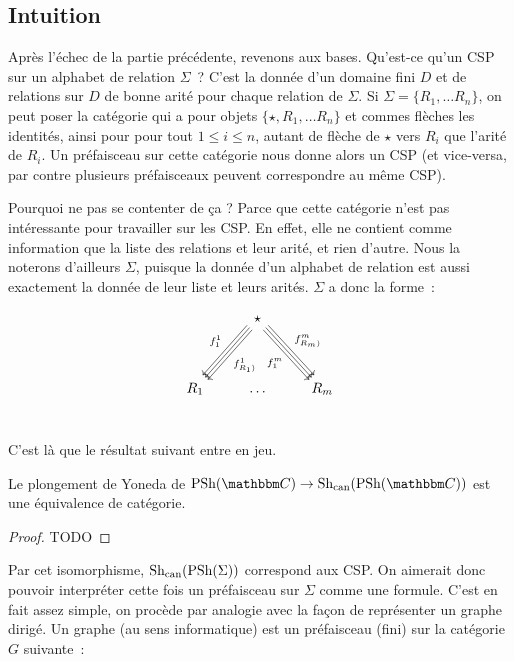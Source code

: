 
\subsection{Intuition}

Après l'échec de la partie précédente, revenons aux bases. Qu'est-ce qu'un CSP
sur un alphabet de relation $\Sigma$~? C'est la donnée d'un domaine fini $D$ et
de relations sur $D$ de bonne arité pour chaque relation de $\Sigma$. Si
$\Sigma = \{R_1, \dots R_n\}$, on peut poser la catégorie qui a pour objets
$\{\star, R_1, \dots R_n\}$ et commes flèches les identités, ainsi pour pour
tout $1\leq i\leq n$, autant de flèche de $\star$ vers $R_i$ que l'arité de
$R_i$. Un préfaisceau sur cette catégorie nous donne alors un CSP (et
vice-versa, par contre plusieurs préfaisceaux peuvent correspondre au même
CSP).

Pourquoi ne pas se contenter de ça ? Parce que cette catégorie n'est pas
intéressante pour travailler sur les CSP. En effet, elle ne contient comme
information que la liste des relations et leur arité, et rien d'autre. Nous la
noterons d'ailleurs $\Sigma$, puisque la donnée d'un alphabet de relation est
aussi exactement la donnée de leur liste et leurs arités. $\Sigma$ a donc la forme~:

\[\begin{tikzcd}
    & \star \arrow[ddl, shift right, swap, "f_1^1"]
            \arrow[ddl]
            \arrow[ddl, shift left, "f_{\ar(R_1)}^1"] %
            \arrow[ddr, shift right, swap, "f_1^m"]
            \arrow[ddr]
            \arrow[ddr, shift left, "f_{\ar(R_m)}^m"]
            \\
    & & \\
    R_1 & \dots & R_m \\
\end{tikzcd}\]

C'est là que le résultat suivant entre en jeu.

\begin{prop}
    Le plongement de Yoneda de $\psh(\C)\rightarrow\shc(\psh(\C))$ est une équivalence
    de catégorie.
\end{prop}

\begin{proof}
    TODO
\end{proof}

Par cet isomorphisme, $\text{Sh}_\text{can}(\text{PSh}(\Sigma))$ correspond aux CSP. On aimerait donc pouvoir
interpréter cette fois un préfaisceau sur $\Sigma$ comme une formule. C'est en fait assez
simple, on procède par analogie avec la façon de représenter un graphe dirigé. Un graphe
(au sens informatique) est un préfaisceau (fini) sur la catégorie $G$ suivante~:

